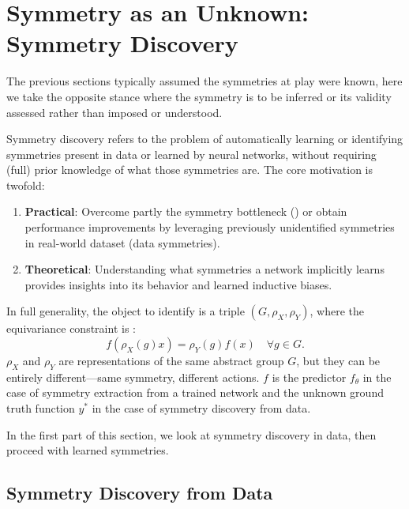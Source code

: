 \documentclass[mathematics,review,submit,moreauthors]{Definitions/mdpi}
\begin{document}
\section{Symmetry as an Unknown: Symmetry Discovery}

The previous sections typically assumed the symmetries at play were known, here we take the opposite stance where the symmetry is to be inferred or its validity assessed rather than imposed or understood.

Symmetry discovery refers to the problem of automatically learning or identifying symmetries present in data or learned by neural networks, without requiring (full) prior knowledge of what those symmetries are.
The core motivation is twofold:
\begin{enumerate}
    \item \textbf{Practical}: Overcome partly the symmetry bottleneck () or obtain performance improvements by leveraging previously unidentified symmetries in real-world dataset (data symmetries).
    \item \textbf{Theoretical}: Understanding what symmetries a network implicitly learns provides insights into its behavior and learned inductive biases.
\end{enumerate}

In full generality, the object to identify is a triple $(G, \rho_X, \rho_Y)$, where the equivariance constraint is :
\begin{equation}
    f(\rho_X(g) x) = \rho_Y(g) f(x) \quad \forall g \in G.
\end{equation}
$\rho_X$ and $\rho_Y$ are representations of the same abstract group $G$, but they can be entirely different---same symmetry, different actions.
$f$ is the predictor $f_\theta$ in the case of symmetry extraction from a trained network and the unknown ground truth function $y^*$ in the case of symmetry discovery from data.

In the first part of this section, we look at symmetry discovery in data, then proceed with learned symmetries.


\subsection{Symmetry Discovery from Data}\label{sec:sym-disc-from-data}

\end{document}
